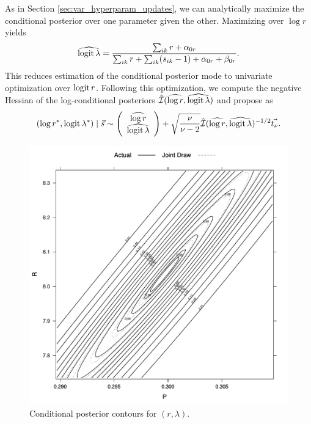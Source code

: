 As in Section \ref{sec:var_hyperparam_updates}, we can analytically maximize  the conditional posterior over one parameter given the other.
Maximizing over $\log r$ yields
%
\begin{equation*}
\widehat{\operatorname{logit} \lambda} = \frac{\sum_{ik}r + \alpha_{0r}}{\sum_{ik}r+\sum_{ik}(s_{ik}-1) + \alpha_{0r} + \beta_{0r}} .
\end{equation*}
%
This reduces estimation of the conditional posterior mode to univariate optimization over $\operatorname{logit} r$.
Following this optimization, we compute the negative Hessian of the log-conditional posteriors $\hat{\mathcal{I}}(\widehat{\log r}, \widehat{\operatorname{logit} \lambda})$ and propose as
\begin{equation*}
(\log r^*, \operatorname{logit} \lambda^*) \mid \vec s \sim \left(\begin{array}{c}
\widehat{\log r} \\
\widehat{\operatorname{logit} \lambda}
\end{array}\right) +
\sqrt{\frac{\nu}{\nu - 2}} \hat{\mathcal{I}}(\widehat{\log r}, \widehat{\operatorname{logit} \lambda})^{-1/2} \vec{t_{\nu}} .
\end{equation*}


\begin{figure}
\centering
\includegraphics[width=1\textwidth]{figures/proteomics/Neg_Bin_Parameter_Draw}
\caption{Conditional posterior contours for $(r, \lambda)$.\label{fig:Negative-binomial-parameters}}
\end{figure}


